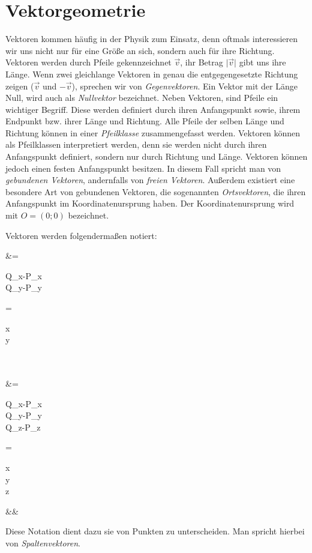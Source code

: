 \documentclass[12pt]{article}
\begin{document}
	\section{Vektorgeometrie}
		Vektoren kommen häufig in der Physik zum Einsatz, denn oftmals interessieren wir uns nicht nur für eine Größe an sich, sondern auch für ihre Richtung. Vektoren werden durch Pfeile gekennzeichnet $\vec v$, ihr Betrag $\vert\vec v\vert$ gibt uns ihre Länge. Wenn zwei gleichlange Vektoren in genau die entgegengesetzte Richtung zeigen ($\vec v$ und $-\vec v$), sprechen wir von \textit{Gegenvektoren}. Ein Vektor mit der Länge Null, wird auch als \textit{Nullvektor} bezeichnet. Neben Vektoren, sind Pfeile ein wichtiger Begriff. Diese werden definiert durch ihren Anfangspunkt sowie, ihrem Endpunkt bzw. ihrer Länge und Richtung. Alle Pfeile der selben Länge und Richtung können in einer \textit{Pfeilklasse} zusammengefasst werden. Vektoren können als Pfeilklassen interpretiert werden, denn sie werden nicht durch ihren Anfangspunkt definiert, sondern nur durch Richtung und Länge. Vektoren können jedoch einen festen Anfangspunkt besitzen. In diesem Fall spricht man von \textit{gebundenen Vektoren}, andernfalls von \textit{freien Vektoren}. Außerdem existiert eine besondere Art von gebundenen Vektoren, die sogenannten \textit{Ortsvektoren}, die ihren Anfangspunkt im Koordinatenursprung haben. Der Koordinatenursprung wird mit $O=(0;0)$ bezeichnet.
		\begin{tcolorbox}[boxsep=0pt,top=.75cm,left=1cm,right=1cm, bottom=.75cm,arc=0pt,auto outer arc,colback=white,colframe=black, enlarge top by=.25cm, enlarge bottom by=.25cm]
			Vektoren werden folgendermaßen notiert:
			\begin{flalign*}
				&=\begin{pmatrix}Q_x-P_x\\Q_y-P_y\end{pmatrix}=\begin{pmatrix}x\\y\end{pmatrix}\\\\
				&=\begin{pmatrix}Q_x-P_x\\Q_y-P_y\\Q_z-P_z\end{pmatrix}=\begin{pmatrix}x\\y\\z\end{pmatrix}&&
			\end{flalign*}
			Diese Notation dient dazu sie von Punkten zu unterscheiden. Man spricht hierbei von \textit{Spaltenvektoren}.
		\end{tcolorbox}
\end{document}
